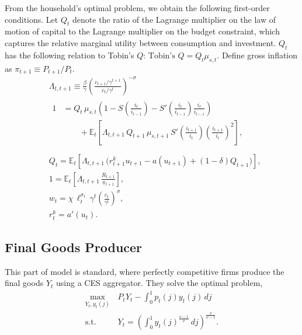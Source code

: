     From the household's optimal problem, we obtain the following first-order conditions. Let $Q_t$ denote the ratio of the Lagrange multiplier on the law of motion of capital to the Lagrange multiplier on the budget constraint, which captures the relative marginal utility between consumption and investment. $Q_t$ has the following relation to Tobin's $Q$: $\text{Tobin's }Q = Q_t \mu_{s, t}$. Define gross inflation as $\pi_{t+1}\equiv P_{t+1}/P_t$.
    \begin{align}
        &\Lambda_{t,t+1} \equiv \frac{\beta}{\gamma}\left(\frac{c_{t+1}/\gamma^{t+1}}{c_t/\gamma^t}\right)^{-\sigma}
        \label{eq:sdf}\\
        &\begin{aligned}
        \label{eq:inv_foc}
        1 &= Q_t\,\mu_{s,t}\left(1 - S\left(\frac{i_t}{i_{t-1}}\right) - S'\left(\frac{i_t}{i_{t-1}}\right)\frac{i_t}{i_{t-1}}\right)
        \\
        &\qquad+ \mathbb{E}_t\left[\Lambda_{t,t+1}\,Q_{t+1}\,\mu_{s,t+1}\,S'\left(\frac{i_{t+1}}{i_t}\right)\left(\frac{i_{t+1}}{i_t}\right)^2\right],\\
        \end{aligned}\\
        &Q_t = \mathbb{E}_t\left[\Lambda_{t,t+1}\,\big(r_{t+1}^k u_{t+1} - a(u_{t+1}) + (1-\delta)Q_{t+1}\big)\right],
        \label{eq:q_euler}\\
        &1 = \mathbb{E}_t\left[\Lambda_{t,t+1}\,\frac{R_{t+1}}{\pi_{t+1}}\right]
        \label{eq:euler_bond},\\
        &w_t = \chi\,\ell_t^{\sigma_\ell}\,\gamma^t\left(\frac{c_t}{\gamma^t}\right)^{\sigma}, \\
        &r_t^k = a'(u_t)
        \label{eq:util_foc}.
    \end{align}

    \subsection{Final Goods Producer}
    This part of model is standard, where perfectly competitive firms produce the final goods $Y_t$ using a CES aggregator. They solve the optimal problem,
    \begin{equation}
        \begin{aligned}
             \max\limits_{Y_t, y_t(j)}\, & P_t Y_t - \int_{0}^{1} p_t(j)y_t(j)\, dj \\
             \text{s.t.  } & Y_t = \left(\int_{0}^{1} y_{t}(j)^{\frac{\nu - 1}{\nu}}\, dj\right)^{\frac{\nu}{\nu - 1}}.
        \end{aligned}
    \end{equation}
    
